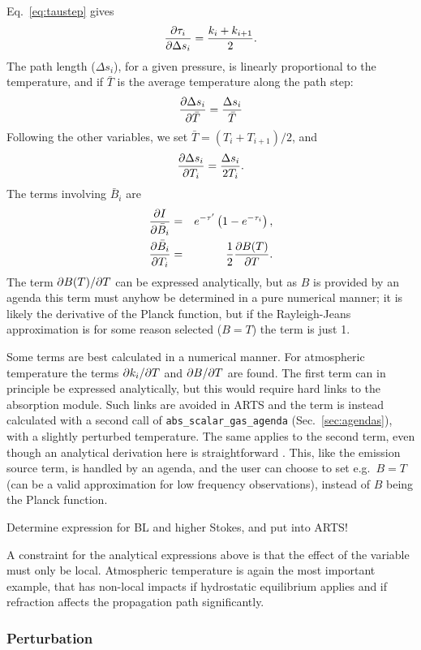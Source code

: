 Eq.~\ref{eq:taustep} gives
\begin{equation}
  \frac{\partial \tau_{i}}{\partial \Delta s_i} = \frac{k_i+k_{i+1}}{2}. 
\end{equation}
The path length ($\Delta s_i$), for a given pressure, is linearly proportional
to the temperature, and if $\bar{T}$ is the average temperature along the path
step:
\begin{equation}
  \frac{\partial \Delta s_i}{\partial \bar{T}} =   \frac{\Delta s_i}{\bar{T}} 
\end{equation}
Following the other variables, we set $\bar{T}=(T_i+T_{i+1})/2$, and
\begin{equation}
  \frac{\partial \Delta s_i}{\partial T_i} = \frac{\Delta s_i}{2T_i}.
\end{equation}
The terms involving $\bar{B}_i$ are
\begin{eqnarray}
   \frac{\partial I}{\partial \bar{B}_i} &=&
   e^{-\tau'}\left(1-e^{-\tau_{i}}\right), \\
   \frac{\partial \bar{B}_i}{\partial T_i} &=& \frac{1}{2}
   \frac{\partial B(T)}{\partial T}. 
\end{eqnarray}
The term $\partial B(T)/\partial T$ can be expressed analytically, but as $B$ is
provided by an agenda this term must anyhow be determined in a pure numerical
manner; it is likely the derivative of the Planck function, but if the
Rayleigh-Jeans approximation is for some reason selected ($B=T$) the term 
is just 1.

Some terms are best calculated in a numerical manner. For atmospheric
temperature the terms $\partial k_i/\partial T$ and $\partial B/\partial T$ are found.
The first term can in principle be expressed analytically, but this would
require hard links to the absorption module. Such links are avoided in ARTS and
the term is instead calculated with a second call of
\texttt{abs\_scalar\_gas\_agenda} (Sec.~\ref{sec:agendas}), with a slightly
perturbed temperature. The same applies to the second term, even though an
analytical derivation here is straightforward \citep{eriksson:studi:02}. This,
like the emission source term, is handled by an agenda, and the user can choose
to set e.g.\ $B=T$ (can be a valid approximation for low frequency
observations), instead of $B$ being the Planck function.



Determine expression for BL and higher Stokes, and put into ARTS!

A constraint for the analytical expressions above is that the effect of the
variable must only be local. Atmospheric temperature is again the most important
example, that has non-local impacts if hydrostatic equilibrium applies and if
refraction affects the propagation path significantly.

\subsubsection{Perturbation}
